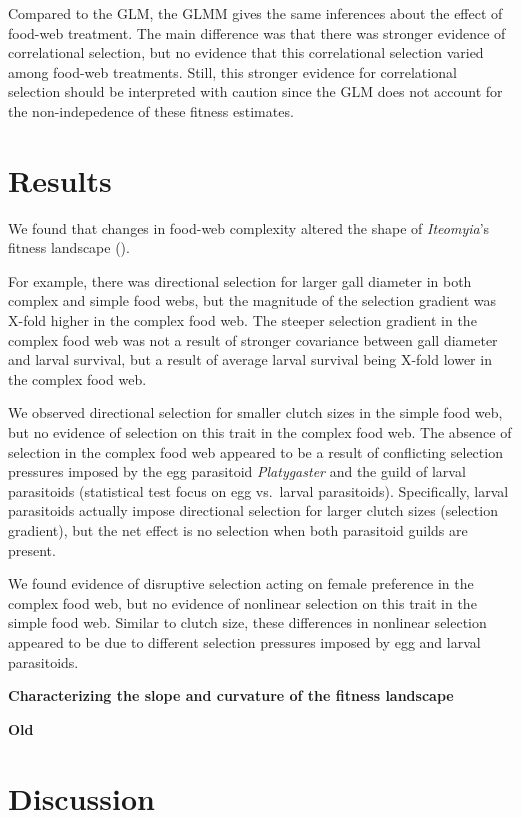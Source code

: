 \documentclass[]{elsarticle} %
\begin{document}
Compared to the GLM, the GLMM gives the same inferences about the effect
of food-web treatment. The main difference was that there was stronger
evidence of correlational selection, but no evidence that this
correlational selection varied among food-web treatments. Still, this
stronger evidence for correlational selection should be interpreted with
caution since the GLM does not account for the non-indepedence of these
fitness estimates.

\section{Results}\label{results}

We found that changes in food-web complexity altered the shape of
\emph{Iteomyia}'s fitness landscape ().

For example, there was directional selection for larger gall diameter in
both complex and simple food webs, but the magnitude of the selection
gradient was X-fold higher in the complex food web. The steeper
selection gradient in the complex food web was not a result of stronger
covariance between gall diameter and larval survival, but a result of
average larval survival being X-fold lower in the complex food web.

We observed directional selection for smaller clutch sizes in the simple
food web, but no evidence of selection on this trait in the complex food
web. The absence of selection in the complex food web appeared to be a
result of conflicting selection pressures imposed by the egg parasitoid
\emph{Platygaster} and the guild of larval parasitoids (statistical test
focus on egg vs.~larval parasitoids). Specifically, larval parasitoids
actually impose directional selection for larger clutch sizes (selection
gradient), but the net effect is no selection when both parasitoid
guilds are present.

We found evidence of disruptive selection acting on female preference in
the complex food web, but no evidence of nonlinear selection on this
trait in the simple food web. Similar to clutch size, these differences
in nonlinear selection appeared to be due to different selection
pressures imposed by egg and larval parasitoids.

\textbf{Characterizing the slope and curvature of the fitness landscape}

\textbf{Old}

\section{Discussion}\label{discussion}
\end{document}
